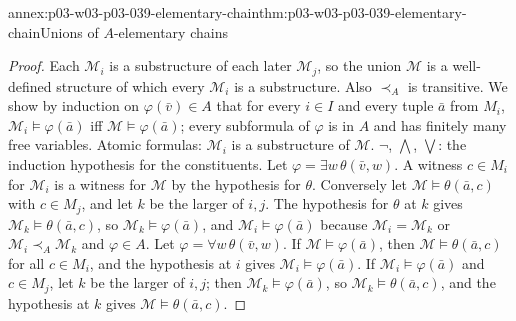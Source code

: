 \begin{annexitem}{annex:p03-w03-p03-039-elementary-chain}{thm:p03-w03-p03-039-elementary-chain}{Unions of \(A\)-elementary chains}
\begin{proof}
Each \(\mathcal M_i\) is a substructure of each later \(\mathcal M_j\), so the
union \(\mathcal M\) is a well-defined structure of which every
\(\mathcal M_i\) is a substructure. Also \(\prec_A\) is transitive. We show by
induction on \(\varphi(\bar v)\in A\) that for every \(i\in I\) and every
tuple \(\bar a\) from \(M_i\), \(\mathcal M_i\models\varphi(\bar a)\) iff
\(\mathcal M\models\varphi(\bar a)\); every subformula of \(\varphi\) is in
\(A\) and has finitely many free variables. Atomic formulas: \(\mathcal M_i\)
is a substructure of \(\mathcal M\). \(\neg\), \(\bigwedge\), \(\bigvee\): the
induction hypothesis for the constituents. Let \(\varphi=\exists w\,\theta(\bar v,w)\).
A witness \(c\in M_i\) for \(\mathcal M_i\) is a witness for \(\mathcal M\)
by the hypothesis for \(\theta\). Conversely let
\(\mathcal M\models\theta(\bar a,c)\) with \(c\in M_j\), and let \(k\) be
the larger of \(i,j\). The hypothesis for \(\theta\) at \(k\) gives
\(\mathcal M_k\models\theta(\bar a,c)\), so
\(\mathcal M_k\models\varphi(\bar a)\), and \(\mathcal M_i\models\varphi(\bar a)\)
because \(\mathcal M_i=\mathcal M_k\) or \(\mathcal M_i\prec_A\mathcal M_k\)
and \(\varphi\in A\). Let \(\varphi=\forall w\,\theta(\bar v,w)\). If
\(\mathcal M\models\varphi(\bar a)\), then \(\mathcal M\models\theta(\bar a,c)\)
for all \(c\in M_i\), and the hypothesis at \(i\) gives
\(\mathcal M_i\models\varphi(\bar a)\). If \(\mathcal M_i\models\varphi(\bar a)\)
and \(c\in M_j\), let \(k\) be the larger of \(i,j\); then
\(\mathcal M_k\models\varphi(\bar a)\), so \(\mathcal M_k\models\theta(\bar a,c)\),
and the hypothesis at \(k\) gives \(\mathcal M\models\theta(\bar a,c)\).
\end{proof}
\end{annexitem}

